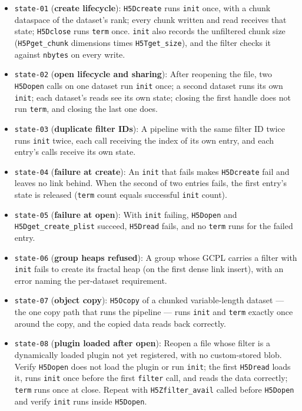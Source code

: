 \documentclass[../RFC-HDFG-2026-003.tex]{subfiles}
\begin{document}
\begin{itemize}
\item \texttt{state-01} (\textbf{create lifecycle}): \texttt{H5Dcreate}
  runs \texttt{init} once, with a chunk dataspace of the dataset's rank;
  every chunk written and read receives that state; \texttt{H5Dclose} runs
  \texttt{term} once.  \texttt{init} also records the unfiltered chunk
  size (\texttt{H5Pget\_chunk} dimensions times \texttt{H5Tget\_size}),
  and the filter checks it against \texttt{nbytes} on every write.
\item \texttt{state-02} (\textbf{open lifecycle and sharing}): After
  reopening the file, two \texttt{H5Dopen} calls on one dataset run
  \texttt{init} once; a second dataset runs its own \texttt{init}; each
  dataset's reads see its own state; closing the first handle does not run
  \texttt{term}, and closing the last one does.
\item \texttt{state-03} (\textbf{duplicate filter IDs}): A pipeline with
  the same filter ID twice runs \texttt{init} twice, each call receiving
  the index of its own entry, and each entry's calls receive its own state.
\item \texttt{state-04} (\textbf{failure at create}): An \texttt{init}
  that fails makes \texttt{H5Dcreate} fail and leaves no link behind.
  When the second of two entries fails, the first entry's state is
  released (\texttt{term} count equals successful \texttt{init} count).
\item \texttt{state-05} (\textbf{failure at open}): With \texttt{init}
  failing, \texttt{H5Dopen} and \texttt{H5Dget\_create\_plist} succeed,
  \texttt{H5Dread} fails, and no \texttt{term} runs for the failed entry.
\item \texttt{state-06} (\textbf{group heaps refused}): A group whose GCPL
  carries a filter with \texttt{init} fails to create its fractal heap
  (on the first dense link insert), with an error naming the per-dataset
  requirement.
\item \texttt{state-07} (\textbf{object copy}): \texttt{H5Ocopy} of a
  chunked variable-length dataset --- the one copy path that runs the
  pipeline --- runs \texttt{init} and \texttt{term} exactly once around the
  copy, and the copied data reads back correctly.
\item \texttt{state-08} (\textbf{plugin loaded after open}): Reopen a file
  whose filter is a dynamically loaded plugin not yet registered, with no
  custom-stored blob.  Verify \texttt{H5Dopen} does not load the plugin or
  run \texttt{init}; the first \texttt{H5Dread} loads it, runs
  \texttt{init} once before the first \texttt{filter} call, and reads the
  data correctly; \texttt{term} runs once at close.  Repeat with
  \texttt{H5Zfilter\_avail} called before \texttt{H5Dopen} and verify
  \texttt{init} runs inside \texttt{H5Dopen}.
\end{itemize}
\end{document}
